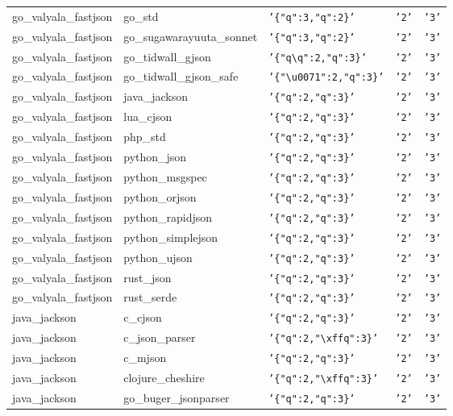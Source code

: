 \documentclass[english, 12pt, a4paper, sci, utf8, a-2b, online]{aaltothesis}
\def\str#1{\texttt{'#1'}}
\begin{document}
\begin{longtable}{lllll}
    go\_valyala\_fastjson & go\_std & \str{\{"q":3,"q":2\}} & \str{2} & \str{3} \\
    go\_valyala\_fastjson & go\_sugawarayuuta\_sonnet & \str{\{"q":3,"q":2\}} & \str{2} & \str{3} \\
    go\_valyala\_fastjson & go\_tidwall\_gjson & \str{\{"q\textbackslash q":2,"q":3\}} & \str{2} & \str{3} \\
    go\_valyala\_fastjson & go\_tidwall\_gjson\_safe & \str{\{"\textbackslash u0071":2,"q":3\}} & \str{2} & \str{3} \\
    go\_valyala\_fastjson & java\_jackson & \str{\{"q":2,"q":3\}} & \str{2} & \str{3} \\
    go\_valyala\_fastjson & lua\_cjson & \str{\{"q":2,"q":3\}} & \str{2} & \str{3} \\
    go\_valyala\_fastjson & php\_std & \str{\{"q":2,"q":3\}} & \str{2} & \str{3} \\
    go\_valyala\_fastjson & python\_json & \str{\{"q":2,"q":3\}} & \str{2} & \str{3} \\
    go\_valyala\_fastjson & python\_msgspec & \str{\{"q":2,"q":3\}} & \str{2} & \str{3} \\
    go\_valyala\_fastjson & python\_orjson & \str{\{"q":2,"q":3\}} & \str{2} & \str{3} \\
    go\_valyala\_fastjson & python\_rapidjson & \str{\{"q":2,"q":3\}} & \str{2} & \str{3} \\
    go\_valyala\_fastjson & python\_simplejson & \str{\{"q":2,"q":3\}} & \str{2} & \str{3} \\
    go\_valyala\_fastjson & python\_ujson & \str{\{"q":2,"q":3\}} & \str{2} & \str{3} \\
    go\_valyala\_fastjson & rust\_json & \str{\{"q":2,"q":3\}} & \str{2} & \str{3} \\
    go\_valyala\_fastjson & rust\_serde & \str{\{"q":2,"q":3\}} & \str{2} & \str{3} \\
    java\_jackson & c\_cjson & \str{\{"q":2,"q":3\}} & \str{2} & \str{3} \\
    java\_jackson & c\_json\_parser & \str{\{"q":2,"\textbackslash xffq":3\}} & \str{2} & \str{3} \\
    java\_jackson & c\_mjson & \str{\{"q":2,"q":3\}} & \str{2} & \str{3} \\
    java\_jackson & clojure\_cheshire & \str{\{"q":2,"\textbackslash xffq":3\}} & \str{2} & \str{3} \\
    java\_jackson & go\_buger\_jsonparser & \str{\{"q":2,"q":3\}} & \str{2} & \str{3} \\

\end{longtable}
\end{document}
